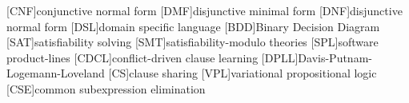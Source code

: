 \documentclass[11pt]{article}
\begin{document}
\begin{acronym}[]
  [CNF]{conjunctive normal form}
  [DMF]{disjunctive minimal form}
  [DNF]{disjunctive normal form}
  [DSL]{domain specific language}
  [BDD]{Binary Decision Diagram}
  [SAT]{satisfiability solving}
  [SMT]{satisfiability-modulo theories}
  [SPL]{software product-lines}
  [CDCL]{conflict-driven clause learning}
  [DPLL]{Davis-Putnam-Logemann-Loveland}
  [CS]{clause sharing}
  [VPL]{variational propositional logic}
  [CSE]{common subexpression elimination}
\end{acronym}

\begin{footnotesize}
  
  
\end{footnotesize}
\end{document}

